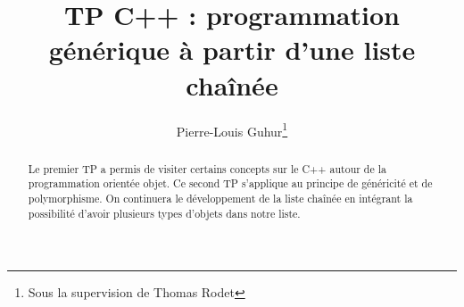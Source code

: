 \documentclass[abstracton]{scrartcl}
\title{TP C++ : programmation générique à partir d'une liste chaînée}
\author{Pierre-Louis Guhur\footnote{Sous la supervision de Thomas Rodet}}
\newcommand*{\rootPath}{./}
\begin{document}
\maketitle

\begin{abstract}
Le premier TP a permis de visiter certains concepts sur le C++ autour de la programmation orientée objet. Ce second TP s'applique au principe de généricité et de polymorphisme.
On continuera le développement de la liste chaînée en intégrant la possibilité d'avoir plusieurs types d'objets dans notre liste.
\end{abstract}









%
%





\ifstandalone

    \appendix
    \printglossary[title=Vocabulaire et abbréviations]
	
	
\fi
\end{document}
